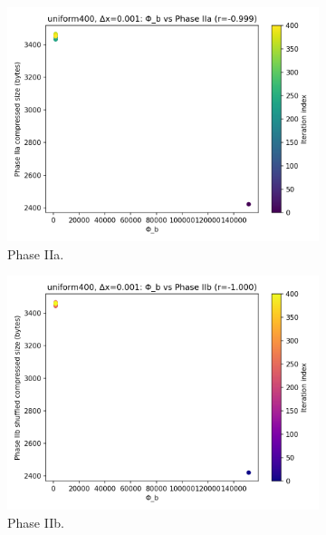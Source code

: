 \documentclass[11pt,a4paper]{article}
\numberwithin{equation}{section}
\begin{document}
\begin{figure}[h!]
\centering
\begin{subfigure}[b]{0.32\textwidth}
\includegraphics[width=\textwidth]{figures/uniform400_dx0.001_phib_vs_phase2a.png}
\caption{Phase IIa.}
\end{subfigure}\hfill
\begin{subfigure}[b]{0.32\textwidth}
\includegraphics[width=\textwidth]{figures/uniform400_dx0.001_phib_vs_phase2b.png}
\caption{Phase IIb.}
\end{subfigure}\hfill
\begin{subfigure}[b]{0.32\textwidth}

\end{subfigure}
\end{figure}
\end{document}
